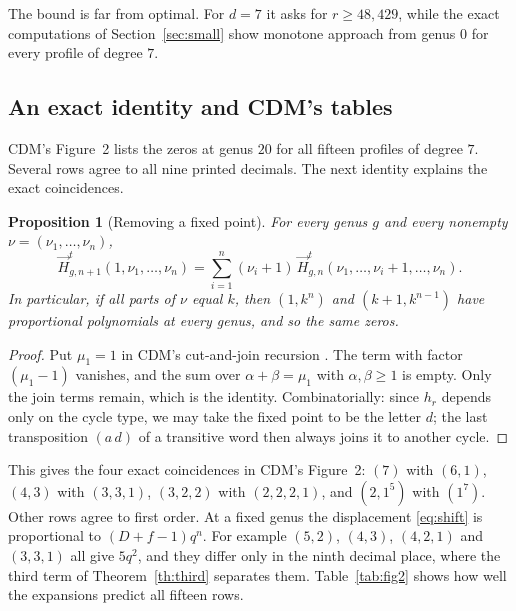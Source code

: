\documentclass[11pt,a4paper]{article}
\newtheorem{proposition}[theorem]{Proposition}
\theoremstyle{definition}\newtheorem{definition}[theorem]{Definition}
\theoremstyle{remark}\newtheorem{remark}[theorem]{Remark}\newtheorem{example}[theorem]{Example}
\numberwithin{equation}{section}
\begin{document}
The bound is far from optimal. For $d=7$ it asks for $r\ge48{,}429$, while the exact computations of Section~\ref{sec:small} show monotone approach from genus $0$ for every profile of degree $7$.

\subsection{An exact identity and CDM's tables}
CDM's Figure~2 lists the zeros at genus $20$ for all fifteen profiles of degree $7$. Several rows agree to all nine printed decimals. The next identity explains the exact coincidences.

\begin{proposition}[Removing a fixed point]\label{pr:fixed}
For every genus $g$ and every nonempty $\nu=(\nu_1,\dots,\nu_n)$,
\[
 \vec H^t_{g,n+1}(1,\nu_1,\dots,\nu_n)=\sum_{i=1}^n(\nu_i+1)\,\vec H^t_{g,n}(\nu_1,\dots,\nu_i+1,\dots,\nu_n).
\]
In particular, if all parts of $\nu$ equal $k$, then $(1,k^{n})$ and $(k+1,k^{n-1})$ have proportional polynomials at every genus, and so the same zeros.
\end{proposition}
\begin{proof}
Put $\mu_1=1$ in CDM's cut-and-join recursion \cite[Theorem~3.7]{cdm}. The term with factor $(\mu_1-1)$ vanishes, and the sum over $\alpha+\beta=\mu_1$ with $\alpha,\beta\ge1$ is empty. Only the join terms remain, which is the identity. Combinatorially: since $h_r$ depends only on the cycle type, we may take the fixed point to be the letter $d$; the last transposition $(a\,d)$ of a transitive word then always joins it to another cycle.
\end{proof}

This gives the four exact coincidences in CDM's Figure~2: $(7)$ with $(6,1)$, $(4,3)$ with $(3,3,1)$, $(3,2,2)$ with $(2,2,2,1)$, and $(2,1^5)$ with $(1^7)$. Other rows agree to first order. At a fixed genus the displacement \eqref{eq:shift} is proportional to $(D+f-1)q^{n}$. For example $(5,2)$, $(4,3)$, $(4,2,1)$ and $(3,3,1)$ all give $5q^2$, and they differ only in the ninth decimal place, where the third term of Theorem~\ref{th:third} separates them. Table~\ref{tab:fig2} shows how well the expansions predict all fifteen rows.
\end{document}
